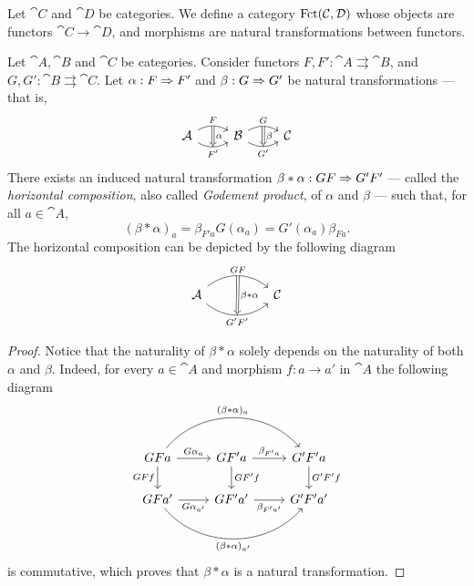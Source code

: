\begin{definition}
\label{def:functor-category}
Let \(\cat C\) and \(\cat D\) be categories. We define a category \(\operatorname{Fct}(\mathcal C,
\mathcal D)\) whose objects are functors \(\cat C \to \cat D\), and morphisms are
natural transformations between functors.
\end{definition}

\begin{proposition}
\label{prop:horizontal-composition-natural-transformation}
Let \(\cat A, \cat B\) and \(\cat C\) be categories. Consider functors \(F, F':
\cat A \rightrightarrows \cat B\), and \(G, G': \cat B \rightrightarrows \cat
C\).  Let \(\alpha: F \Rightarrow F'\) and \(\beta: G \Rightarrow G'\) be natural
transformations --- that is,
\[
  \begin{tikzcd}
    \cat A \ar[r, bend left, "F"{name=F}]
    \ar[r, bend right, "{F'}"'{name=FF}]
    &\cat B \ar[r, bend left, "G"{name=G}]
    \ar[r, bend right, "{G'}"'{name=GG}]
    & \cat C
    \ar[Rightarrow, from=F, to=FF, "\alpha"]
    \ar[Rightarrow, from=G, to=GG, "\beta"]
  \end{tikzcd}
\]
There exists an induced natural transformation
\(\beta * \alpha: G F \Rightarrow G' F'\) --- called the \emph{horizontal composition},
also called \emph{Godement product}, of \(\alpha\) and \(\beta\) --- such that,
for all \(a \in \cat A\),
\[
(\beta * \alpha)_a = \beta_{F' a} G(\alpha_a) = G'(\alpha_a) \beta_{F a}.
\]
The horizontal composition can be depicted by the following diagram
\[
  \begin{tikzcd}
    \cat A \ar[rr, bend left=40, "G F"{name=s}]
    \ar[rr, bend right=40, swap, "{G' F'}"{name=t}]
    &&\cat C
    \ar[Rightarrow, from=s, to=t, "\beta * \alpha"]
  \end{tikzcd}
\]
\end{proposition}

\begin{proof}
Notice that the naturality of \(\beta * \alpha\) solely depends on the
naturality of both \(\alpha\) and \(\beta\). Indeed, for every \(a \in \cat A\)
and morphism \(f: a \to a'\) in \(\cat A\) the following diagram
\[
\begin{tikzcd}
G F a \ar[d, "G F f"'] \ar[r, "G \alpha_a"]
\ar[rr, bend left=50, "{(\beta * \alpha)_{a}}"]
&G F' a \ar[r, "\beta_{F' a}"] \ar[d, "G F' f"]
& G' F' a \ar[d, "G' F' f"]
\\
G F a' \ar[r, "G \alpha_{a'}"']
\ar[rr, bend right=50, "{(\beta * \alpha)_{a'}}"']
&G F' a' \ar[r, "\beta_{F' a'}"']
&G' F' a'
\end{tikzcd}
\]
is commutative, which proves that \(\beta * \alpha\) is a natural
transformation.
\end{proof}

